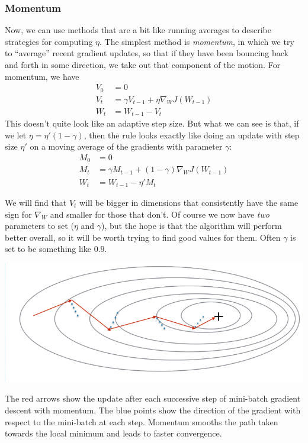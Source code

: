 \subsubsection{Momentum} 
Now, we can use methods that are a bit like running averages to
describe strategies for computing $\eta$.
The simplest method is {\em momentum}, in  which we try to ``average'' recent
gradient updates,  so that if they have been bouncing back and forth
in some direction, we take out that component of the motion.  For
momentum, we have
\begin{align*}
  V_0 & = 0                                         \\
  V_t & = \gamma V_{t-1} + \eta \nabla_W J(W_{t-1}) \\
  W_t & = W_{t-1} - V_t
\end{align*}
This doesn't quite look like an adaptive step size.  But what we can
see is that, if we let $\eta = \eta'(1 - \gamma)$, then the rule looks exactly like doing an update with
step size $\eta'$ on a moving average of the gradients with parameter
$\gamma$:
\begin{align*}
  M_0 & = 0                                                 \\
  M_t & = \gamma M_{t-1} + (1 - \gamma) \nabla_W J(W_{t-1}) \\
  W_t & = W_{t-1} - \eta' M_t
\end{align*}


We will find that $V_t$ will be bigger in dimensions that consistently
have the same sign for $\nabla_{W}$ and smaller for those that
don't.   Of course we now have {\em two}  parameters  to set ($\eta$
and $\gamma$), but the
hope is  that the algorithm will perform better overall, so it will be
worth trying to find good values for them.  Often $\gamma$ is  set to
be something like $0.9$.
\begin{examplebox}
  \begin{center}
    \includegraphics[scale=0.7]{figures/momentum.png}
  \end{center}
  The red arrows show the update after each successive step of
  mini-batch gradient descent with momentum.  The blue points show the
  direction of the gradient with respect to the mini-batch at each step.
  Momentum smooths the path taken towards the local minimum and leads to
  faster convergence.
\end{examplebox}

